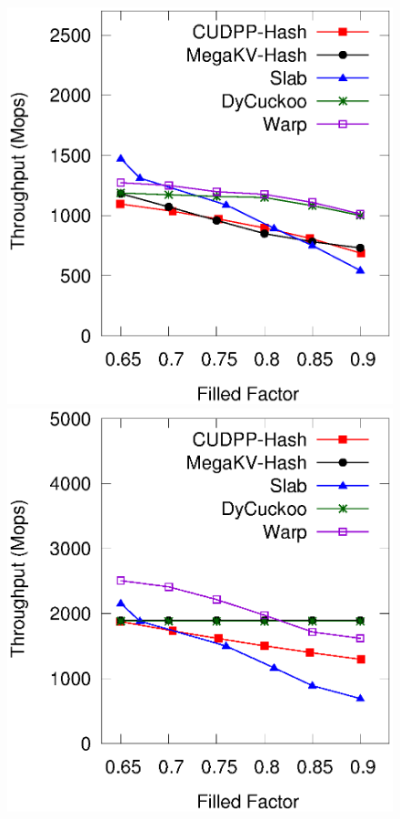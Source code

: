 %
\begin{figure}[t]
	\begin{minipage}{0.48\linewidth}\centering
		\includegraphics[width=\linewidth]{pic/static-load_factor/random/insert.eps}
		\centerline{}
	\end{minipage}
	\hfill
	\begin{minipage}{0.48\linewidth}\centering
		\includegraphics[width=\linewidth]{pic/static-load_factor/random/search.eps}
		\centerline{}
	\end{minipage}
	\caption{}
	\label{fig:static-filled-factor}
\end{figure}

